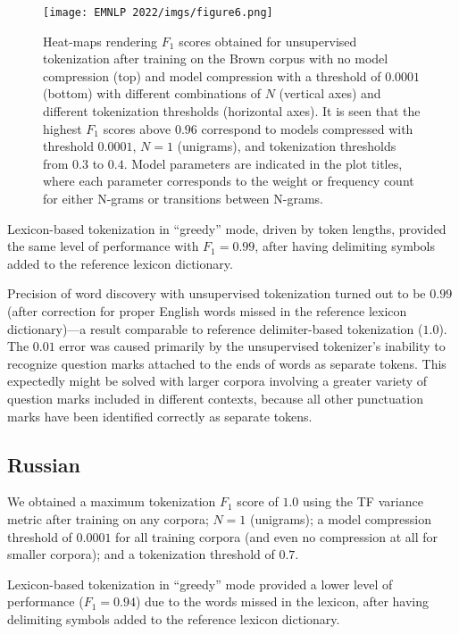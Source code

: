 \documentclass[11pt]{article}
\begin{document}
\begin{figure}
  \texttt{[image: EMNLP 2022/imgs/figure6.png]}
  \caption{Heat-maps rendering $F_1$ scores obtained for unsupervised tokenization after training on the Brown corpus with no model compression (top) and model compression with a threshold of $0.0001$ (bottom) with different combinations of $N$ (vertical axes) and different tokenization thresholds (horizontal axes). It is seen that the highest $F_1$ scores above $0.96$ correspond to models compressed with threshold $0.0001$, $N=1$ (unigrams), and tokenization thresholds from $0.3$ to $0.4$. Model parameters are indicated in the plot titles, where each parameter corresponds to the weight or frequency count for either N-grams or transitions between N-grams.}
\end{figure}

Lexicon-based tokenization in “greedy” mode, driven by token lengths, provided the same level of performance with $F_1=0.99$, after having delimiting symbols added to the reference lexicon dictionary.  

Precision of word discovery with unsupervised tokenization turned out to be $0.99$ (after correction for proper English words missed in the reference lexicon dictionary)—a result comparable to reference delimiter-based tokenization ($1.0$). The $0.01$ error was caused primarily by the unsupervised tokenizer’s inability to recognize question marks attached to the ends of words as separate tokens. This expectedly might be solved with larger corpora involving a greater variety of question marks included in different contexts, because all other punctuation marks have been identified correctly as separate tokens.   

\subsection{\label{42}Russian}

We obtained a maximum tokenization $F_1$ score of $1.0$ using the TF variance metric after training on any corpora; $N=1$ (unigrams); a model compression threshold of $0.0001$ for all training corpora (and even no compression at all for smaller corpora); and a tokenization threshold of $0.7$.

Lexicon-based tokenization in “greedy” mode provided a lower level of performance ($F_1=0.94$) due to the words missed in the lexicon, after having delimiting symbols added to the reference lexicon dictionary.  
\end{document}
